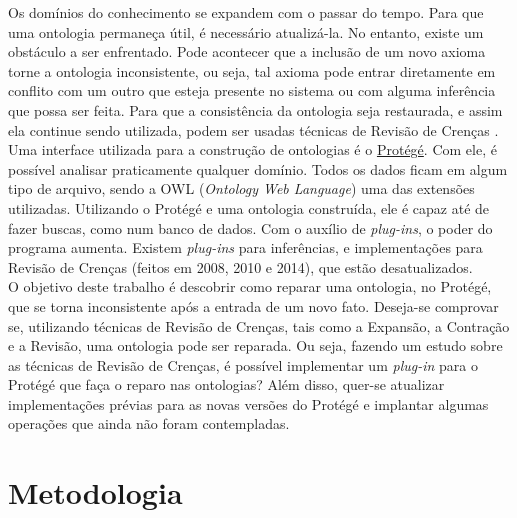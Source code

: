 \documentclass[12pt,letterpaper]{article}
\begin{document}
	Os domínios do conhecimento se expandem com o passar do tempo. Para que uma ontologia permaneça útil, é necessário atualizá-la. No entanto, existe um obstáculo a ser enfrentado. Pode acontecer que a inclusão de um novo axioma torne a ontologia inconsistente, ou seja, tal axioma pode entrar diretamente em conflito com um outro que esteja presente no sistema ou com alguma inferência que possa ser feita. Para que a consistência da ontologia seja restaurada, e assim ela continue sendo utilizada, podem ser usadas técnicas de Revisão de Crenças\cite{gardenfors2003belief} \cite{gardenfors1992belief}. \\
	
	Uma interface utilizada para a construção de ontologias é o \href{https://protege.stanford.edu/}{Protégé}. Com ele, é possível analisar praticamente qualquer domínio. Todos os dados ficam em algum tipo de arquivo, sendo a OWL (\textit{Ontology Web Language}) uma das extensões utilizadas. Utilizando o Protégé e uma ontologia construída, ele é capaz até de fazer buscas, como num banco de dados. Com o auxílio de \textit{plug-ins}, o poder do programa aumenta. Existem \textit{plug-ins} para inferências, e implementações para Revisão de Crenças (feitos em 2008\cite{ribeiro2008}, 2010\cite{ribeiro2010revisao} e 2014\cite{resina2014belief}), que estão desatualizados. \\ 
	
	O objetivo deste trabalho é descobrir como reparar uma ontologia, no Protégé, que se torna inconsistente após a entrada de um novo fato. Deseja-se comprovar se, utilizando técnicas de Revisão de Crenças, tais como a Expansão, a Contração e a Revisão, uma ontologia pode ser reparada. Ou seja, fazendo um estudo sobre as técnicas de Revisão de Crenças, é possível implementar um \textit{plug-in} para o Protégé que faça o reparo nas ontologias? Além disso, quer-se atualizar implementações prévias para as novas versões do Protégé e implantar algumas operações que ainda não foram contempladas.  \\
	
	\section{Metodologia}
	
\end{document}
